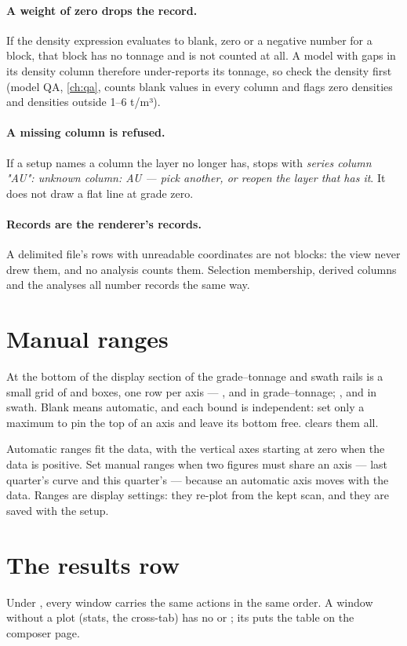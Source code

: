 \paragraph{A weight of zero drops the record.} If the density expression evaluates to blank, zero or a negative number for a block, that block has no tonnage and is not counted at all. A model with gaps in its density column therefore under-reports its tonnage, so check the density first (model QA, \cref{ch:qa}, counts blank values in every column and flags zero densities and densities outside 1–6 t/m³).

\paragraph{A missing column is refused.} If a setup names a column the layer no longer has,  stops with \emph{series column "AU": unknown column: AU — pick another, or reopen the layer that has it}. It does not draw a flat line at grade zero.

\paragraph{Records are the renderer's records.} A delimited file's rows with unreadable coordinates are not blocks: the view never drew them, and no analysis counts them. Selection membership, derived columns and the analyses all number records the same way.

\section{Manual ranges}\label{sec:analysis-ranges}
At the bottom of the display section of the grade–tonnage and swath rails is a small grid of  and  boxes, one row per axis — ,  and  in grade–tonnage; ,  and  in swath. Blank means automatic, and each bound is independent: set only a maximum to pin the top of an axis and leave its bottom free.  clears them all.

Automatic ranges fit the data, with the vertical axes starting at zero when the data is positive. Set manual ranges when two figures must share an axis — last quarter's curve and this quarter's — because an automatic axis moves with the data. Ranges are display settings: they re-plot from the kept scan, and they are saved with the setup.

\section{The results row}\label{sec:analysis-results}
Under , every window carries the same actions in the same order. A window without a plot (stats, the cross-tab) has no  or ; its  puts the table on the composer page.

